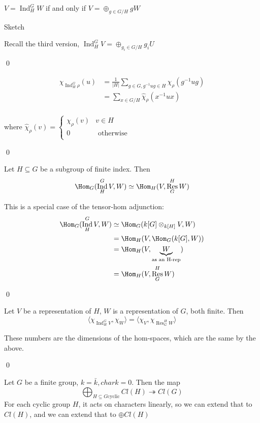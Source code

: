 \documentclass[x11names,reqno,14pt]{extarticle}
\newcommand{\bark}{\bar{k}}
\DeclareMathOperator{\Res}{Res}
\newcommand{\onto}{\twoheadrightarrow}
\DeclareMathOperator{\Ind}{Ind}
\begin{document}
\prop 

$V = \Ind_H^GW$ if and only if $V = \oplus_{g\in G/H}gW$

\proof

Sketch

Recall the third version, $\Ind_H^GV = \oplus_{g_i\in G/H}g_iU$

\qed

\prop

\begin{align*}
\chi_{\Ind_H^G\rho}(u) & = \frac{1}{|H|} \sum_{g\in G, g^{-1}ug \in H}\chi_\rho(g^{-1}ug) \\
& = \sum_{x\in G/H}\hat{\chi}_\rho(x^{-1}ux)\\
\end{align*}

where $\hat{\chi}_\rho(v) = \begin{cases} \chi_\rho(v) & v \in H \\ 0 & \text{ otherwise } \\ \end{cases}$

\proof

\qed

\prop 

Let $H \subseteq G$ be a subgroup of finite index. Then 
\[
\Hom_G(\Ind_H^GV,W) \simeq \Hom_H(V, \Res_G^HW)
\]

\proof

This is a special case of the tensor-hom adjunction: 
\begin{align*}
\Hom_G(\Ind_H^GV,W) & \simeq \Hom_G(k[G]\otimes_{k[H]}V, W) \\
& = \Hom_H(V,\Hom_G(k[G],W)) \\
& = \Hom_H(V, \underbrace{W}_{ \text{as an H-rep}} )\\
& = \Hom_H(V,\Res_G^HW)
\end{align*} 

\qed

\cor

Let $V$ be a representation of $H$, $W$ is a representation of $G$, both finite. Then 
\[
\langle \chi_{\Ind_H^GV},\chi_W\rangle = \langle \chi_V, \chi_{\Res_G^HW}\rangle
\]

\proof

These numbers are the dimensions of the hom-spaces, which are the same by the above. 

\qed

\thm[Artin]

Let $G$ be a finite group, $k = \bark, char k = 0$. Then the map
\[
\bigoplus_{H\subseteq G \text{cyclic}}Cl(H)\onto Cl(G)
\]
For each cyclic group $H$, it acts on characters linearly, so we can extend that to $Cl(H)$, and we can extend that to $\oplus Cl(H)$
\proof
\end{document}
